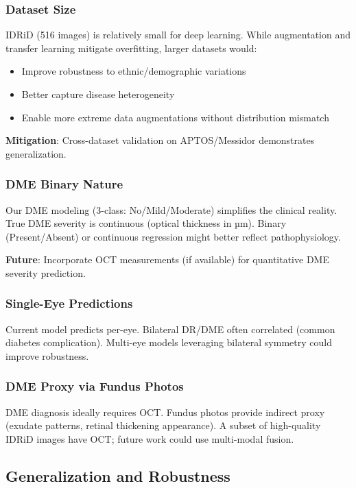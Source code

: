 \subsubsection{Dataset Size}

IDRiD (516 images) is relatively small for deep learning. While augmentation and transfer learning mitigate overfitting, larger datasets would:
\begin{itemize}
    \item Improve robustness to ethnic/demographic variations
    \item Better capture disease heterogeneity
    \item Enable more extreme data augmentations without distribution mismatch
\end{itemize}

\textbf{Mitigation}: Cross-dataset validation on APTOS/Messidor demonstrates generalization.

\subsubsection{DME Binary Nature}

Our DME modeling (3-class: No/Mild/Moderate) simplifies the clinical reality. True DME severity is continuous (optical thickness in µm). Binary (Present/Absent) or continuous regression might better reflect pathophysiology.

\textbf{Future}: Incorporate OCT measurements (if available) for quantitative DME severity prediction.

\subsubsection{Single-Eye Predictions}

Current model predicts per-eye. Bilateral DR/DME often correlated (common diabetes complication). Multi-eye models leveraging bilateral symmetry could improve robustness.

\subsubsection{DME Proxy via Fundus Photos}

DME diagnosis ideally requires OCT. Fundus photos provide indirect proxy (exudate patterns, retinal thickening appearance). A subset of high-quality IDRiD images have OCT; future work could use multi-modal fusion.

\subsection{Generalization and Robustness}

